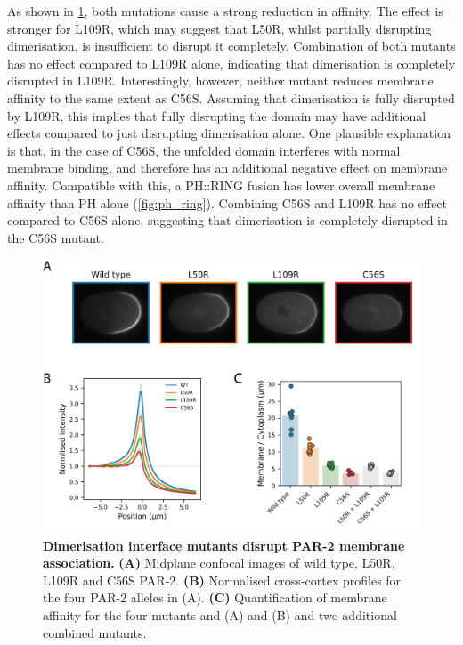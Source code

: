 \documentclass[12pt]{"article"}
\newcommand{\mycaption}[2]{\caption[#1]{\textbf{#1.} #2}}
\begin{document}
As shown in \cref{fig:dimer_interface_mutants_in_vivo}, both mutations cause a strong reduction in affinity. The effect is stronger for L109R, which may suggest that L50R, whilst partially disrupting dimerisation, is insufficient to disrupt it completely. Combination of both mutants has no effect compared to L109R alone, indicating that dimerisation is completely disrupted in L109R. Interestingly, however, neither mutant reduces membrane affinity to the same extent as C56S. Assuming that dimerisation is fully disrupted by L109R, this implies that fully disrupting the domain may have additional effects compared to just disrupting dimerisation alone. One plausible explanation is that, in the case of C56S, the unfolded domain interferes with normal membrane binding, and therefore has an additional negative effect on membrane affinity. Compatible with this, a PH::RING fusion has lower overall membrane affinity than PH alone (\cref{fig:ph_ring}). Combining C56S and L109R has no effect compared to C56S alone, suggesting that dimerisation is completely disrupted in the C56S mutant.\\

\begin{figure}
\includegraphics[scale=0.9]{dimer_interface_mutants_in_vivo}
\centering
\mycaption{Dimerisation interface mutants disrupt PAR-2 membrane association}{
\textbf{(A)} Midplane confocal images of wild type, L50R, L109R and C56S PAR-2.
\textbf{(B)} Normalised cross-cortex profiles for the four PAR-2 alleles in (A).
\textbf{(C)} Quantification of membrane affinity for the four mutants and (A) and (B) and two additional combined mutants.
}
\label{fig:dimer_interface_mutants_in_vivo}
\end{figure}
\end{document}
